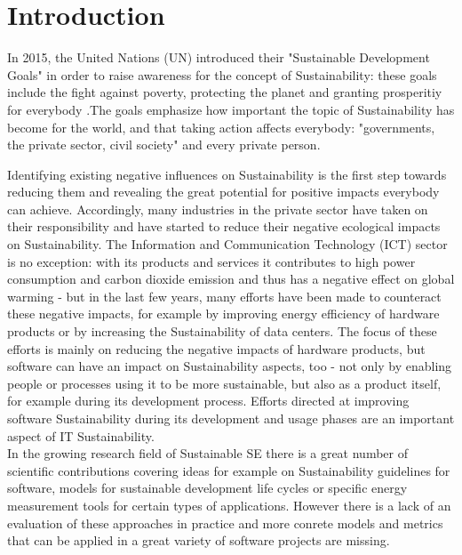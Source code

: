 \documentclass[oribibl]{llncs}
\begin{document}
\section{Introduction}
In 2015, the United Nations (UN) introduced their "Sustainable Development Goals" \cite{UN_transform_15} in order to raise awareness for the concept of Sustainability: these goals include the fight against poverty, protecting the planet and granting prosperitiy for everybody \cite{nino_sustainable_2017}.The goals emphasize how important the topic of Sustainability has become for the world, and that taking action affects everybody: "governments, the private sector, civil society"\cite[p.\,1]{nino_sustainable_2017} and every private person.

Identifying existing negative influences on Sustainability is the first step towards reducing them and revealing the great potential for positive impacts  everybody can achieve. Accordingly, many industries in the private sector  have taken on their responsibility and have started to reduce their negative ecological impacts on Sustainability. The Information and Communication Technology (ICT) sector is no exception: with its products and services it contributes to high power consumption and carbon dioxide emission \cite{gartner07} and thus has a negative effect on global warming \cite{smart2020} - but in the last few years, many efforts have been made to counteract these negative impacts, for example by improving energy efficiency of hardware products or by increasing the Sustainability of data centers. %
The focus of these efforts is mainly on reducing the negative impacts of hardware products, but software can have an impact on Sustainability aspects, too - not only by enabling people or processes using it to be more sustainable, but also as a product itself, for example during its development process. %
Efforts directed at improving software Sustainability during its development and usage phases are an important aspect of IT Sustainability.\\
In the growing research field of Sustainable SE there is a great number of scientific contributions covering ideas for example on Sustainability guidelines for software, models for sustainable development life cycles or specific energy measurement tools for certain types of applications. However there is a lack of an evaluation of these approaches in practice and more conrete models and metrics that can be applied in a great variety of software projects are missing.
\end{document}
